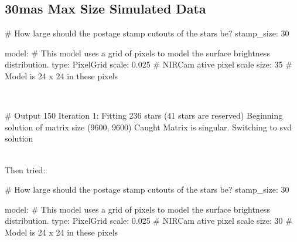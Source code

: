 \documentclass[a4 paper]{article}
\numberwithin{equation}{section}
\newcommand{\0}{\mathbf{0}}
\begin{document}
\subsection{30mas Max Size Simulated Data}
\begin{python}
# How large should the postage stamp cutouts of the stars be?
    stamp_size: 30

model:
    # This model uses a grid of pixels to model the surface brightness distribution.
    type: PixelGrid
    scale: 0.025      # NIRCam ative pixel scale
    size: 35          # Model is 24 x 24 in these pixels
\end{python}\\
\begin{python}
    # Output 150
Iteration 1: Fitting 236 stars
             (41 stars are reserved)
Beginning solution of matrix size (9600, 9600)
Caught Matrix is singular.
Switching to svd solution

\end{python}\\
Then tried:
\begin{python}
# How large should the postage stamp cutouts of the stars be?
    stamp_size: 30

model:
    # This model uses a grid of pixels to model the surface brightness distribution.
    type: PixelGrid
    scale: 0.025      # NIRCam ative pixel scale
    size: 30          # Model is 24 x 24 in these pixels
\end{python}\\
\end{document}

